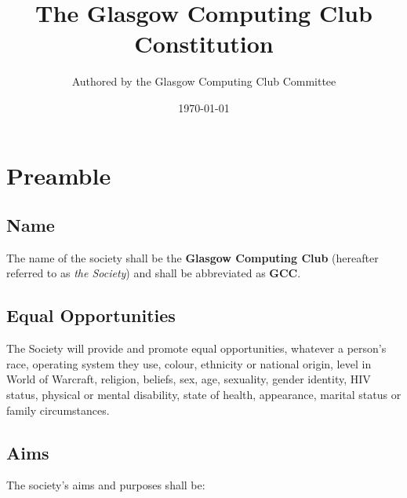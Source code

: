 \documentclass{report}
\newcommand{\society}{Glasgow Computing Club}
\newcommand{\shortsociety}{GCC}
\begin{document}
\title{The \society{} Constitution}
\author{Authored by the \society{} Committee}
\date{\today}
\maketitle{}

\tableofcontents
\newpage

\chapter{Preamble}

	\section{Name}

		The name of the society shall be the \textbf{\society{}} (hereafter referred to as \textit{the Society}) and shall be abbreviated as \textbf{\shortsociety{}}.

	\section{Equal Opportunities}

		The Society will provide and promote equal opportunities, whatever a person’s race, operating system they use, colour, ethnicity or national origin, level in World of Warcraft, religion, beliefs, sex, age, sexuality, gender identity, HIV status, physical or mental disability, state of health, appearance, marital status or family circumstances. 

	\section{Aims}

		The society's aims and purposes shall be:
\end{document}
